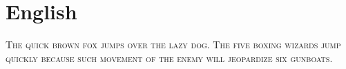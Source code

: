 
\presection\section*{\checkyes English}\postsection

\noindent\textsc{The quick brown fox jumps over the lazy dog.
The five boxing wizards jump quickly because such movement 
of the enemy will jeopardize six gunboats.}